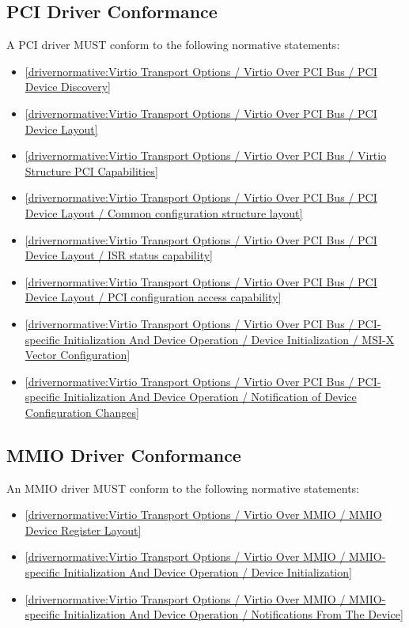 \subsection{PCI Driver Conformance}\label{sec:Conformance / Driver Conformance / PCI Driver Conformance}

A PCI driver MUST conform to the following normative statements:

\begin{itemize}
\item \ref{drivernormative:Virtio Transport Options / Virtio Over PCI Bus / PCI Device Discovery}
\item \ref{drivernormative:Virtio Transport Options / Virtio Over PCI Bus / PCI Device Layout}
\item \ref{drivernormative:Virtio Transport Options / Virtio Over PCI Bus / Virtio Structure PCI Capabilities}
\item \ref{drivernormative:Virtio Transport Options / Virtio Over PCI Bus / PCI Device Layout / Common configuration structure layout}
\item \ref{drivernormative:Virtio Transport Options / Virtio Over PCI Bus / PCI Device Layout / ISR status capability}
\item \ref{drivernormative:Virtio Transport Options / Virtio Over PCI Bus / PCI Device Layout / PCI configuration access capability}
\item \ref{drivernormative:Virtio Transport Options / Virtio Over PCI Bus / PCI-specific Initialization And Device Operation / Device Initialization / MSI-X Vector Configuration}
\item \ref{drivernormative:Virtio Transport Options / Virtio Over PCI Bus / PCI-specific Initialization And Device Operation / Notification of Device Configuration Changes}
\end{itemize}

\subsection{MMIO Driver Conformance}\label{sec:Conformance / Driver Conformance / MMIO Driver Conformance}

An MMIO driver MUST conform to the following normative statements:

\begin{itemize}
\item \ref{drivernormative:Virtio Transport Options / Virtio Over MMIO / MMIO Device Register Layout}
\item \ref{drivernormative:Virtio Transport Options / Virtio Over MMIO / MMIO-specific Initialization And Device Operation / Device Initialization}
\item \ref{drivernormative:Virtio Transport Options / Virtio Over MMIO / MMIO-specific Initialization And Device Operation / Notifications From The Device}
\end{itemize}

